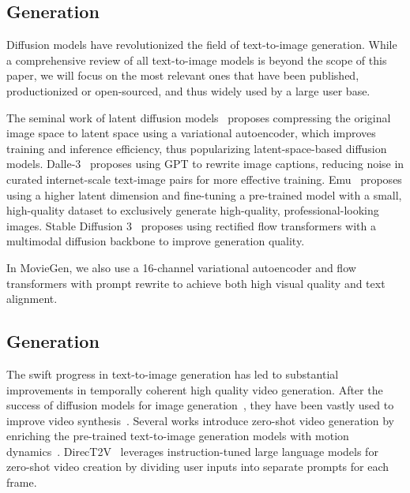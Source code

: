 \subsection{\TextToI Generation}

Diffusion models have revolutionized the field of text-to-image generation. While a comprehensive review of all text-to-image models is beyond the scope of this paper, we will focus on the most relevant ones that have been published, productionized or open-sourced, and thus widely used by a large user base.

The seminal work of latent diffusion models~\citep{rombach2021highresolution} proposes compressing the original image space to latent space using a variational autoencoder, which improves training and inference efficiency, thus popularizing latent-space-based diffusion models. Dalle-3~\citep{dalle3} proposes using GPT to rewrite image captions, reducing noise in curated internet-scale text-image pairs for more effective training. Emu~\citep{dai2023emu} proposes using a higher latent dimension and fine-tuning a pre-trained model with a small, high-quality dataset to exclusively generate high-quality, professional-looking images. Stable Diffusion 3~\citep{sd3} proposes using rectified flow transformers with a multimodal diffusion backbone to improve generation quality.

In MovieGen, we also use a 16-channel variational autoencoder and flow transformers with prompt rewrite to achieve both high visual quality and text alignment.

\subsection{\TextToV Generation}

The swift progress in text-to-image generation has led to substantial improvements in temporally coherent high quality video generation. After the success of diffusion models for image generation~\citep{dhariwal2021diffusion, ramesh2022hierarchical}, they have been vastly used to improve video synthesis~\citep{NEURIPS2022_39235c56}.
Several works introduce zero-shot video generation by enriching the pre-trained text-to-image generation models with motion dynamics~\citep{text2video-zero, wu2023tune}. DirecT2V~\citep{hong2023direct2v} leverages instruction-tuned large language models for zero-shot video creation by dividing user inputs into separate prompts for each frame.


